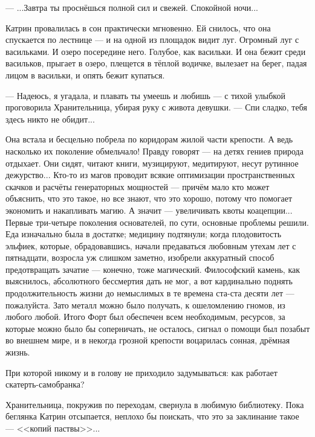 --- ...Завтра ты проснёшься полной сил и свежей. Спокойной ночи...

Катрин провалилась в сон практически мгновенно. Ей снилось, что она спускается по лестнице ---
и на одной из площадок видит луг. Огромный луг с васильками. И озеро посередине него. Голубое, как васильки.
И она бежит среди васильков, прыгает в озеро, плещется в тёплой водичке, вылезает на берег, падая лицом в васильки,
и опять бежит купаться.

--- Надеюсь, я угадала, и плавать ты умеешь и любишь --- с тихой улыбкой проговорила Хранительница,
убирая руку с живота девушки. --- Спи сладко, тебя здесь никто не обидит...

Она встала и бесцельно побрела по коридорам жилой части крепости. А ведь насколько их поколение обмельчало!
Правду говорят --- на детях гениев природа отдыхает. Они сидят, читают книги, музицируют, медитируют,
несут рутинное дежурство... Кто-то из магов проводит всякие оптимизации пространственных скачков
и расчёты генераторных мощностей --- причём мало кто может объяснить, что это такое, но все знают, что это хорошо,
потому что помогает экономить и накапливать магию. А значит --- увеличивать квоты коацепции...
Первые три-четыре поколения основателей, по сути, основные проблемы решили. Еда изначально была в достатке;
медицину подтянули; когда плодовитость эльфиек, которые, обрадовавшись, начали предаваться любовным утехам лет с пятнадцати,
возросла уж слишком заметно, изобрели аккуратный способ предотвращать зачатие --- конечно, тоже магический.
Философский камень, как выяснилось, абсолютного бессмертия дать не мог,
а вот кардинально поднять продолжительность жизни до немыслимых в те времена ста-ста десяти лет --- пожалуйста.
Зато металл можно было получать, к ошеломлению гномов, из любого любой.
Итого Форт был обеспечен всем необходимым, ресурсов, за которые можно было бы соперничать, не осталось,
сигнал о помощи был позабыт во внешнем мире, и в некогда грозной крепости воцарилась сонная, дрёмная жизнь.

При которой никому и в голову не приходило задумываться: как работает скатерть-самобранка?

Хранительница, покружив по переходам, свернула в любимую библиотеку.
Пока беглянка Катрин отсыпается, неплохо бы поискать, что это за заклинание такое --- <<копий паствы>>...

\emptypar


\emptypar

